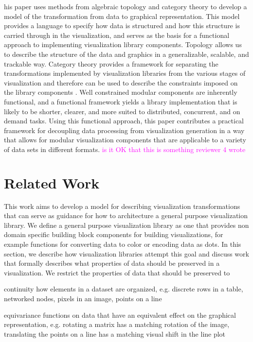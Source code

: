 \documentclass[10pt,journal,compsoc]{IEEEtran}
\newcommand{\note}[1]{\textcolor{magenta}{#1}}
\theoremstyle{definition}
\theoremstyle{remark}
\begin{document}
his paper uses methods from algebraic topology and category theory to develop a model of the transformation from data to graphical representation. This model provides a language to specify how data is structured and how this structure is carried through in the visualization, and serves as the basis for a functional approach to implementing visualization library components. Topology allows us to describe the structure of the data and graphics in a generalizable, scalable, and trackable way. Category theory provides a framework for separating the transformations implemented by visualization libraries from the various stages of visualization and therefore can be used to describe the constraints imposed on the library components \cite{wielsManagementEvolvingSpecifications1998,goguenCategoricalManifesto1991}. Well constrained modular components are inherently functional\cite{hughesWhyFunctionalProgramming1989}, and a functional framework yields a library implementation that is likely to be shorter, clearer, and more suited to distributed, concurrent, and on demand tasks\cite{huHowFunctionalProgramming2015}. Using this functional approach, this paper contributes a practical framework for decoupling data processing from visualization generation in a way that allows for modular visualization components that are applicable to a variety of data sets in different formats. \note{is it OK that this is something reviewer 4 wrote}



\section{Related Work}
This work aims to develop a model for describing visualization transformations that can serve as guidance for how to architecture a general purpose visualization library. We define a general purpose visualization library as one that provides non domain specific building block components\cite{wongsuphasawatNavigatingWideWorld2021} for building visualizations, for example functions for converting data to color or encoding data as dots. In this section, we describe how visualization libraries attempt this goal and discuss work that formally describes what properties of data should be preserved in a visualization. We restrict the properties of data that should be preserved to 

\begin{LaTeXdescription}
  \item [continuity] how elements in a dataset are organized, e.g. discrete rows in a table, networked nodes, pixels in an image, points on a line
  \item [equivariance] functions on data that have an equivalent effect on the graphical representation, e.g. rotating a matrix has a matching rotation of the image, translating the points on a line has a matching visual shift in the line plot
\end{LaTeXdescription}
\end{document}
